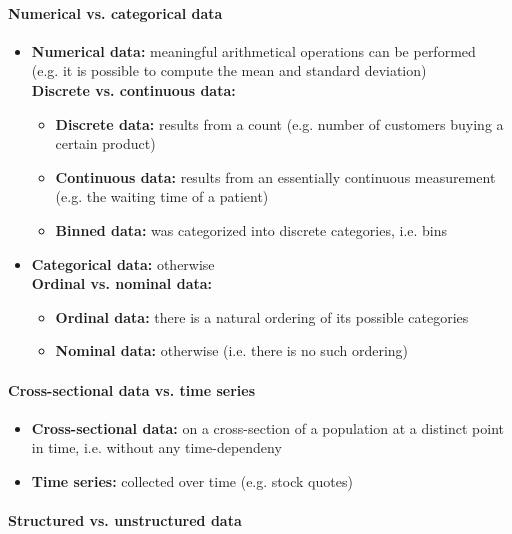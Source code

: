 \documentclass[a4paper, landscape, 6pt, fleqn]{scrartcl}
\renewcommand{\emph}[1]{\textbf{#1}}
\begin{document}
\begin{multicols*}{4}
\paragraph{Numerical vs. categorical data}

\begin{itemize}
\item \emph{Numerical data:} meaningful arithmetical operations can be performed \\
(e.g. it is possible to compute the mean and standard deviation) \\
\emph{Discrete vs. continuous data:}
\begin{itemize}
\item \emph{Discrete data:} results from a count (e.g. number of customers buying a certain product)
\item \emph{Continuous data:} results from an essentially continuous measurement (e.g. the waiting time of a patient)
\item \emph{Binned data:} was categorized into discrete categories, i.e. bins
\end{itemize}
\item \emph{Categorical data:} otherwise \\
\emph{Ordinal vs. nominal data:}
\begin{itemize}
\item \emph{Ordinal data:}  there is a natural ordering of its possible categories
\item \emph{Nominal data:} otherwise (i.e. there is no such ordering)
\end{itemize}
\end{itemize}

\paragraph{Cross-sectional data vs. time series}

\begin{itemize}
\item \emph{Cross-sectional data:} on a cross-section of a population at a distinct point in time, i.e. without any time-dependeny
\item \emph{Time series:} collected over time (e.g. stock quotes)
\end{itemize}

\paragraph{Structured vs. unstructured data}


\end{multicols*}
\end{document}
